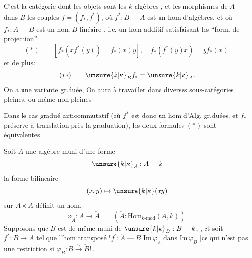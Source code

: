 C'est la catégorie dont les objets sont les $k$-algèbres , et les morphismes de $A$ dans $B$ les couples $f=(f_*,f^*)$, où $f^*:B\mathbin{\text{---}}A$ est un hom d'algèbres, et où $f_*:A\mathbin{\text{---}}B$ est un hom $B$ linéaire , i.e. un hom additif satisfaisant les ``form. de projection''
\[
(*)\qquad[f_*(xf^*(y))=f_*(x)y],\quad f_*(f^*(y)x)=yf_*(x).
\]
et de plus:
\[
(**)\qquad\unsure{k|\kappa}_Bf_*=\unsure{k|\kappa}_A.
\]
On a une variante gr.duée,  On aura à travailler dans diverses sous-catégories pleines, ou même non pleines.

Dans le cas gradué anticommutatif (où $f^*$ est donc un hom d'Alg. gr.duées, et  $f_*$ préserve à translation  près la graduation), les deux formules $(*)$ sont équivalentes.


Soit $A$ une algèbre muni d'une forme
\[
\unsure{k|\kappa}_A:A\mathbin{\text{---}}k
\]
 la forme bilinéaire
\[
(x,y)\mapsto\unsure{k|\kappa}(xy)
\]
sur $A\times A$  définit un hom.  
\[
\varphi_A:A\longrightarrow\check A\qquad(\check A:\mathrm{Hom}_{k\text{-}\mathrm{mod}}(A,k)).
\]
Supposons que $B$ est de même muni de $\unsure{k|\kappa}_B:B\mathbin{\text{---}}k$, , et soit $f^*:B\longrightarrow A$ tel que l'hom transposé ${}^tf^*:\check A\mathbin{\text{---}}\check B$  $\mathrm{Im}\,\varphi_A$ dans $\mathrm{Im}\,\varphi_B$ [ce qui n'est pas une restriction si $\varphi_B:B\overset{\sim}\longrightarrow\check B$!].

